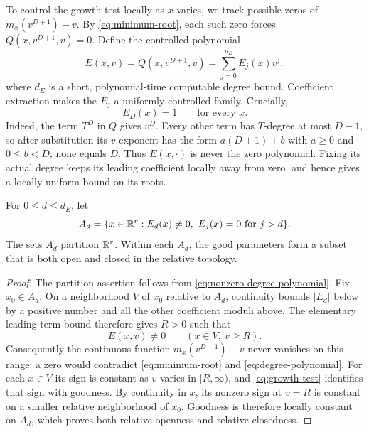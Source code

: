To control the growth test locally as $x$ varies, we track possible
zeros of $m_x(v^{D+1})-v$.  By \eqref{eq:minimum-root}, each such
zero forces $Q(x,v^{D+1},v)=0$.  Define the controlled polynomial
\begin{equation}\label{eq:degree-polynomial}
 E(x,v)=Q(x,v^{D+1},v)=\sum_{j=0}^{d_E}E_j(x)v^j,
\end{equation}
where $d_E$ is a short, polynomial-time computable degree bound.
Coefficient extraction makes the $E_j$ a uniformly controlled family.
Crucially,
\begin{equation}\label{eq:nonzero-degree-polynomial}
 E_D(x)=1\qquad\text{for every }x.
\end{equation}
Indeed, the term $T^D$ in $Q$ gives $v^D$.  Every other term has
$T$-degree at most $D-1$, so after substitution its $v$-exponent has
the form $a(D+1)+b$ with $a\ge0$ and $0\le b<D$; none equals $D$.
Thus $E(x,\cdot)$ is never the zero polynomial.
Fixing its actual degree keeps its leading coefficient locally away
from zero, and hence gives a locally uniform bound on its roots.

\begin{proposition}
\label{prop:degree-pieces}
For $0\le d\le d_E$, let
\[
 A_d=\{x\in\R^r:E_d(x)\ne0,\ E_j(x)=0\text{ for }j>d\}.
\]
The sets $A_d$ partition $\mathbb R^r$.  Within each $A_d$, the good
parameters form a subset that is both open and closed in the relative
topology.
\end{proposition}

\begin{proof}
The partition assertion follows from
\eqref{eq:nonzero-degree-polynomial}.  Fix $x_0\in A_d$.
On a neighborhood $V$ of $x_0$ relative to $A_d$, continuity bounds
$|E_d|$ below by a positive number and all the other coefficient
moduli above.  The elementary leading-term bound therefore gives
$R>0$ such that
\[
 E(x,v)\ne0\qquad(x\in V,\ v\ge R).
\]
Consequently the continuous function
$m_x(v^{D+1})-v$ never vanishes on this range: a zero would contradict
\eqref{eq:minimum-root} and \eqref{eq:degree-polynomial}.
For each $x\in V$ its sign is constant as $v$ varies in $[R,\infty)$,
and \eqref{eq:growth-test} identifies that sign with goodness.
By continuity in $x$, its nonzero sign at $v=R$ is constant on a
smaller relative neighborhood of $x_0$.  Goodness is therefore locally
constant on $A_d$, which proves both relative openness and relative
closedness.
\end{proof}

